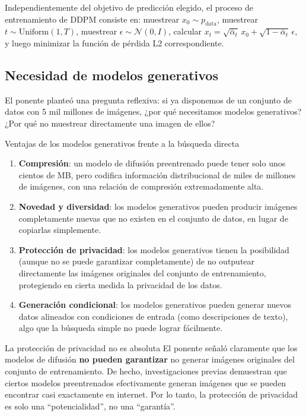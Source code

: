 \documentclass[a4paper]{article}
\begin{document}
Independientemente del objetivo de predicción elegido, el proceso de entrenamiento de DDPM consiste en: muestrear $x_0 \sim p_{\text{data}}$, muestrear $t \sim \text{Uniform}(1,T)$, muestrear $\epsilon \sim \mathcal{N}(0,I)$, calcular $x_t = \sqrt{\bar{\alpha}_t}\, x_0 + \sqrt{1-\bar{\alpha}_t}\, \epsilon$, y luego minimizar la función de pérdida L2 correspondiente.

\subsection{Necesidad de modelos generativos}

El ponente planteó una pregunta reflexiva: si ya disponemos de un conjunto de datos con 5 mil millones de imágenes, ¿por qué necesitamos modelos generativos? ¿Por qué no muestrear directamente una imagen de ellos?

\begin{importantbox}{Ventajas de los modelos generativos frente a la búsqueda directa}
\begin{enumerate}
    \item \textbf{Compresión}: un modelo de difusión preentrenado puede tener solo unos cientos de MB, pero codifica información distribucional de miles de millones de imágenes, con una relación de compresión extremadamente alta.
    \item \textbf{Novedad y diversidad}: los modelos generativos pueden producir imágenes completamente nuevas que no existen en el conjunto de datos, en lugar de copiarlas simplemente.
    \item \textbf{Protección de privacidad}: los modelos generativos tienen la posibilidad (aunque no se puede garantizar completamente) de no outputear directamente las imágenes originales del conjunto de entrenamiento, protegiendo en cierta medida la privacidad de los datos.
    \item \textbf{Generación condicional}: los modelos generativos pueden generar nuevos datos alineados con condiciones de entrada (como descripciones de texto), algo que la búsqueda simple no puede lograr fácilmente.
\end{enumerate}
\end{importantbox}

\begin{warningbox}{La protección de privacidad no es absoluta}
El ponente señaló claramente que los modelos de difusión \textbf{no pueden garantizar} no generar imágenes originales del conjunto de entrenamiento. De hecho, investigaciones previas demuestran que ciertos modelos preentrenados efectivamente generan imágenes que se pueden encontrar casi exactamente en internet. Por lo tanto, la protección de privacidad es solo una ``potencialidad'', no una ``garantía''.
\end{warningbox}
\end{document}
